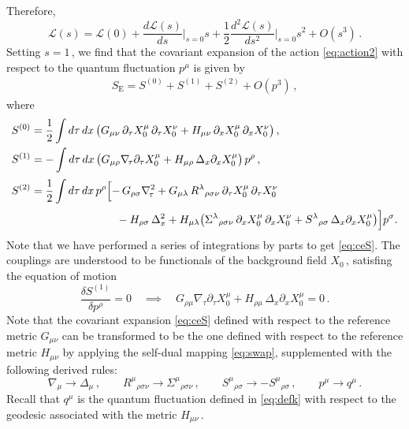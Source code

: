 \documentclass[11pt]{article}
\newcommand{\be}{\begin{equation}}
\newcommand{\ee}{\end{equation}}
\newcommand{\CL}{\mathcal{L}}
\newcommand{\p}{\partial}
\begin{document}
%
Therefore,
%
\be
	\CL (s) = \CL (0) + \frac{d \CL(s)}{ds} \bigg|_{s=0} s + \frac{1}{2} \frac{d^2 \! \CL (s)}{d s^2} \bigg|_{s=0} s^2 + O(s^3)\,.	
\ee
%
Setting $s=1$\,, we find that 
the covariant expansion of the action \eqref{eq:action2} with respect to the quantum fluctuation $p^\mu$ is given by
%
\begin{align} \label{eq:ceS}
	S_\text{E} = S^{(0)} + S^{(1)} + S^{(2)} + O(p^3)\,, 
\end{align}
%
where
%
\begin{subequations}
\begin{align}
	S^{(0)} & = \frac{1}{2} \int d\tau \, dx \, \bigl( G_{\mu\nu} \, \p_\tau X^\mu_0 \, \p_\tau X^\nu_0 + H_{\mu\nu} \, \p_x X^\mu_0 \, \p_x X^\nu_0 \bigr)\,, \\
	S^{(1)} & = - \int d\tau \, dx \, \bigl( G_{\mu\rho} \nabla_{\!\tau} \p_\tau X_0^\mu + H_{\mu\rho} \, \Delta_x \p_x X_0^\mu \bigr) \, p^\rho\,, \\[2pt]
	S^{(2)} & = \frac{1}{2} \int d\tau \, dx \, p^\rho \Bigl[ - \, G_{\rho\sigma} \nabla_{\!\tau}^2 + G_{\mu\lambda} \, R^\lambda{}_{\rho\sigma\nu} \, \p_\tau X_0^\mu \, \p_\tau X_0^\nu \notag \\[2pt]
		& \hspace{2.73cm} - H_{\rho\sigma} \, \Delta_x^2 + H_{\mu\lambda} \bigl( \Sigma^\lambda{}_{\rho\sigma\nu} \, \p_x X_0^\mu \, \p_x X_0^\nu + S^\lambda{}_{\rho\sigma} \, \Delta_x \p_x X_0^\mu \bigr) \Bigr] p^\sigma.
\end{align}
\end{subequations}
%
Note that we have performed a series of integrations by parts to get \eqref{eq:ceS}. The couplings are understood to be functionals of the background field $X_0$\,, satisfing the equation of motion
%
\be \label{eq:eom}
	\frac{\delta S^{(1)}}{\delta p^\rho} = 0 
		\quad \implies \quad
	G_{\rho\mu} \nabla_{\!\tau} \p_\tau X_0^\mu + H_{\rho\mu} \, \Delta_x \p_x X_0^\mu = 0\,.
\ee
%
Note that the covariant expansion \eqref{eq:ceS} defined with respect to the reference metric $G_{\mu\nu}$ can be transformed to be the one defined with respect to the reference metric $H_{\mu\nu}$ by applying the self-dual mapping \eqref{eq:swap}, supplemented with the following derived rules:
%
\be \label{eq:ellk}
	\nabla_{\!\mu} \longrightarrow \Delta_\mu\,,
		\qquad
	R^\mu{}_{\rho\sigma\nu} \longrightarrow \Sigma^\mu{}_{\rho\sigma\nu}\,,
		\qquad
	S^\mu{}_{\rho\sigma} \longrightarrow - S^\mu{}_{\rho\sigma}\,,
		\qquad 
	p^\mu \longrightarrow q^\mu\,.
\ee
%
Recall that $q^\mu$ is the quantum fluctuation defined in \eqref{eq:defk} with respect to the geodesic associated with the metric $H_{\mu\nu}$\,.   
\end{document}
